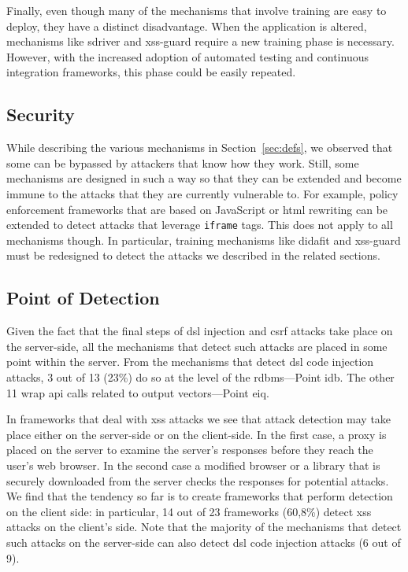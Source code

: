 \documentclass[conference]{IEEEtran}
\begin{document}
Finally, even though many of the mechanisms that involve
training are easy to deploy, they have a distinct disadvantage.
When the application is altered, mechanisms like {\sc sd}river
and {\sc xss-guard} require a new training phase is necessary.
However, with the increased adoption of automated testing
and continuous integration frameworks, this phase could be
easily repeated.

\subsection{Security}

While describing the various mechanisms in Section~\ref{sec:defs}, we
observed that some can be bypassed by attackers that know how they
work. Still, some mechanisms are designed in such a way so that they
can be extended and become immune to the attacks that they are
currently vulnerable to. For example, policy enforcement frameworks
that are based on JavaScript or {\sc html} rewriting can be extended
to detect attacks that leverage {\tt iframe} tags. This does not apply
to all mechanisms though. In particular, training mechanisms like {\sc
  didafit} and {\sc xss-guard} must be redesigned to detect the
attacks we described in the related sections.

\subsection{Point of Detection}

Given the fact that the final steps of
{\sc dsl} injection and {\sc csrf} attacks take place
on the server-side, all the mechanisms that detect
such attacks are placed in some point within the server.
From the mechanisms that detect {\sc dsl} code injection
attacks, 3 out of 13 (23\%) do so at the level
of the {\sc rdbms}---Point i{\sc db}.
The other 11 wrap {\sc api} calls related to output
vectors---Point {\sc e}i{\sc q}.

In frameworks that deal with {\sc xss} attacks we
see that attack detection may take place either on the server-side or
on the client-side. In the first case, a proxy is placed on the server
to examine the server's responses before they reach the user's web
browser. In the second case a modified browser or a library that is
securely downloaded from the server checks the responses for potential
attacks. We find that the tendency so far is to create frameworks that
perform detection on the client side: in particular, 14 out of 23
frameworks (60,8\%) detect {\sc xss} attacks on the
client's side. Note that the majority of the mechanisms that detect
such attacks on the server-side can also detect {\sc dsl} code
injection attacks (6 out of 9).
\end{document}

